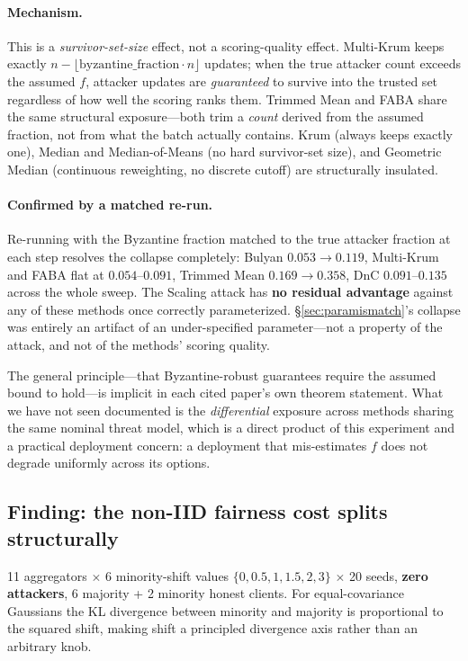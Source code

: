 \documentclass[11pt,a4paper]{article}
\begin{document}
\paragraph{Mechanism.} This is a \emph{survivor-set-size} effect, not a
scoring-quality effect. Multi-Krum keeps exactly
$n - \lfloor \text{byzantine\_fraction} \cdot n \rfloor$ updates; when the
true attacker count exceeds the assumed $f$, attacker updates are
\emph{guaranteed} to survive into the trusted set regardless of how well
the scoring ranks them. Trimmed Mean and FABA share the same structural
exposure---both trim a \emph{count} derived from the assumed fraction, not
from what the batch actually contains. Krum (always keeps exactly one),
Median and Median-of-Means (no hard survivor-set size), and Geometric
Median (continuous reweighting, no discrete cutoff) are structurally
insulated.

\paragraph{Confirmed by a matched re-run.} Re-running with the Byzantine
fraction matched to the true attacker fraction at each step resolves the
collapse completely: Bulyan $0.053 \rightarrow 0.119$, Multi-Krum and FABA
flat at $0.054$--$0.091$, Trimmed Mean $0.169 \rightarrow 0.358$, DnC
$0.091$--$0.135$ across the whole sweep. The Scaling attack has
\textbf{no residual advantage} against any of these methods once correctly
parameterized. \S\ref{sec:paramismatch}'s collapse was entirely an
artifact of an under-specified parameter---not a property of the attack,
and not of the methods' scoring quality.

The general principle---that Byzantine-robust guarantees require the
assumed bound to hold---is implicit in each cited paper's own theorem
statement. What we have not seen documented is the \emph{differential}
exposure across methods sharing the same nominal threat model, which is a
direct product of this experiment and a practical deployment concern: a
deployment that mis-estimates $f$ does not degrade uniformly across its
options.

\subsection{Finding: the non-IID fairness cost splits structurally}
\label{sec:fairness}

11 aggregators $\times$ 6 minority-shift values $\{0, 0.5, 1, 1.5, 2, 3\}$
$\times$ 20 seeds, \textbf{zero attackers}, 6 majority + 2 minority honest
clients. For equal-covariance Gaussians the KL divergence between minority
and majority is proportional to the squared shift, making shift a
principled divergence axis rather than an arbitrary knob.
\end{document}

